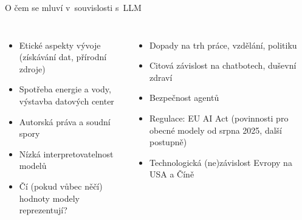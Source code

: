 \begin{frame}{O čem se mluví v~souvislosti s~LLM}
    \begin{columns}[t]
    \begin{itemize}[<+->]

        \item Etické aspekty vývoje (získávání dat, přírodní zdroje)

        \item Spotřeba energie a vody, výstavba datových center

        \item Autorská práva a soudní spory

        \item Nízká interpretovatelnost modelů

        \item Čí (pokud vůbec něčí) hodnoty modely reprezentují?

    \end{itemize}
    \begin{itemize}[<+->]

        \item Dopady na trh práce, vzdělání, politiku

        \item Citová závislost na chatbotech, duševní zdraví

        \item Bezpečnost agentů

        \item Regulace: EU AI Act (povinnosti pro obecné modely od
            srpna 2025, další postupně)

        \item Technologická (ne)závislost Evropy na USA a Číně

    \end{itemize}
    \end{columns}
\end{frame}